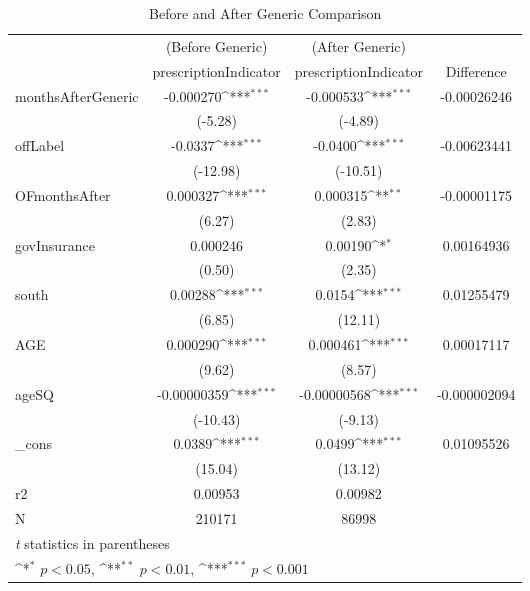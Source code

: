 \begin{table}[htbp]\centering
\def\sym#1{\ifmmode^{#1}\else\(^{#1}\)\fi}
\caption{Before and After Generic Comparison\label{tab1}}
\begin{tabular}{l*{3}{c}}
\hline\hline
            &\multicolumn{1}{c}{(Before Generic)}&\multicolumn{1}{c}{(After Generic)}&\multicolumn{1}{c}{}\\
            &\multicolumn{1}{c}{prescriptionIndicator}&\multicolumn{1}{c}{prescriptionIndicator}&\multicolumn{1}{c}{Difference}\\
\hline
monthsAfterGeneric&   -0.000270\sym{***}&   -0.000533\sym{***}& -0.00026246\\
            &     (-5.28)         &     (-4.89)         & \\
[1em]
offLabel    &     -0.0337\sym{***}&     -0.0400\sym{***}& -0.00623441\\
            &    (-12.98)         &    (-10.51)         & \\
[1em]
OFmonthsAfter&    0.000327\sym{***}&    0.000315\sym{**} & -0.00001175\\
            &      (6.27)         &      (2.83)         & \\
[1em]
govInsurance&    0.000246         &     0.00190\sym{*}  & 0.00164936\\
            &      (0.50)         &      (2.35)         & \\
[1em]
south       &     0.00288\sym{***}&      0.0154\sym{***}& 0.01255479\\
            &      (6.85)         &     (12.11)         & \\
[1em]
AGE         &    0.000290\sym{***}&    0.000461\sym{***}& 0.00017117\\
            &      (9.62)         &      (8.57)         & \\
[1em]
ageSQ       & -0.00000359\sym{***}& -0.00000568\sym{***}& -0.000002094\\
            &    (-10.43)         &     (-9.13)         & \\
[1em]
\_cons      &      0.0389\sym{***}&      0.0499\sym{***}& 0.01095526\\
            &     (15.04)         &     (13.12)         & \\
\hline
r2          &     0.00953         &     0.00982         \\
N           &      210171         &       86998         \\
\hline\hline
\multicolumn{3}{l}{\footnotesize \textit{t} statistics in parentheses}\\
\multicolumn{3}{l}{\footnotesize \sym{*} \(p<0.05\), \sym{**} \(p<0.01\), \sym{***} \(p<0.001\)}\\
\end{tabular}
\end{table}
